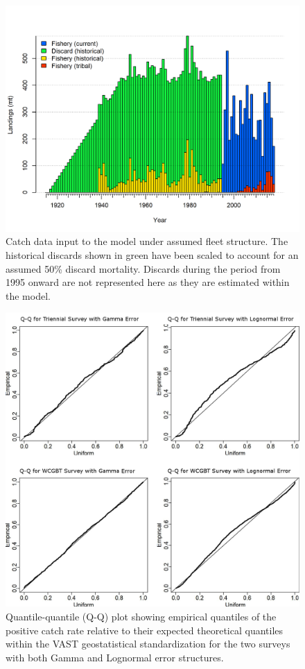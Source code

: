 \documentclass[]{article}
\begin{document}
\begin{figure}
\centering
\includegraphics{r4ss/plots_mod1/catch2 landings stacked.png}
\caption{Catch data input to the model under assumed fleet structure.
The historical discards shown in green have been scaled to account for
an assumed 50\% discard mortality. Discards during the period from 1995
onward are not represented here as they are estimated within the model.
\label{fig:catch_input_plot}}
\end{figure}

\FloatBarrier

\begin{figure}
\centering
\includegraphics{Figures/VAST_QQ_plots.png}
\caption{Quantile-quantile (Q-Q) plot showing empirical quantiles of the
positive catch rate relative to their expected theoretical quantiles
within the VAST geostatistical standardization for the two surveys with
both Gamma and Lognormal error structures.\label{fig:VAST_QQ_plots}}
\end{figure}
\end{document}
